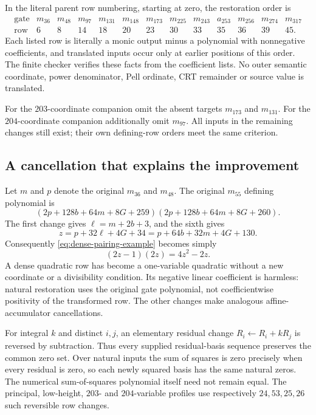 In the literal parent row numbering, starting at zero, the restoration
order is
\[
\begin{array}{c|rrrrrrrrrrrr}
\text{gate}&m_{36}&m_{48}&m_{97}&m_{131}&m_{148}&m_{173}&m_{225}&m_{243}&a_{253}&m_{256}&m_{274}&m_{317}\\
\text{row}&6&8&14&18&20&23&30&33&35&36&39&45 .
\end{array}
\]
Each listed row is literally a monic output minus a polynomial with
nonnegative coefficients, and translated inputs occur only at earlier
positions of this order.  The finite checker verifies these facts from the
coefficient lists.  No outer semantic coordinate, power denominator, Pell
ordinate, CRT remainder or source value is translated.

For the $203$-coordinate companion omit the absent targets $m_{173}$ and
$m_{131}$.  For the $204$-coordinate companion additionally omit $m_{97}$.
All inputs in the remaining changes still exist; their own defining-row
orders meet the same criterion.

\subsection{A cancellation that explains the improvement}

Let $m$ and $p$ denote the original $m_{36}$ and $m_{48}$.  The original
$m_{55}$ defining polynomial is
\begin{equation}
 (2p+128b+64m+8G+259)(2p+128b+64m+8G+260).
 \label{eq:dense-pairing-example}
\end{equation}
The first change gives $\ell=m+2b+3$, and the sixth gives
\[
 z=p+32\ell+4G+34=p+64b+32m+4G+130.
\]
Consequently \eqref{eq:dense-pairing-example} becomes simply
\begin{equation}
 (2z-1)(2z)=4z^2-2z.
\end{equation}
A dense quadratic row has become a one-variable quadratic without a new
coordinate or a divisibility condition.  Its negative linear coefficient
is harmless: natural restoration uses the original gate polynomial, not
coefficientwise positivity of the transformed row.  The other changes
make analogous affine-accumulator cancellations.

For integral $k$ and distinct $i,j$, an elementary residual change
$R_i\gets R_i+kR_j$ is reversed by subtraction.  Thus every supplied
residual-basis sequence preserves the common zero set.  Over natural inputs
the sum of squares is zero precisely when every residual is zero, so each
newly squared basis has the same natural zeros.  The numerical
sum-of-squares polynomial itself need not remain equal.  The principal,
low-height, $203$- and $204$-variable profiles use respectively
$24,53,25,26$ such reversible row changes.

